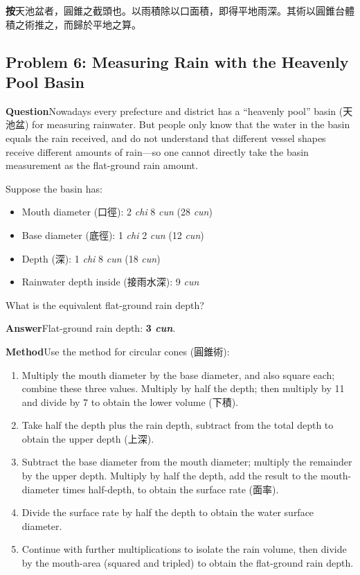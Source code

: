 \documentclass[11pt,a4paper]{article}
\newcommand{\AnCN}{\textbf{\color{headcolor}按}}
\newcommand{\WenEN}{\textbf{\color{headcolor}Question}}
\newcommand{\DaEN}{\textbf{\color{headcolor}Answer}}
\newcommand{\ShuEN}{\textbf{\color{headcolor}Method}}
\begin{document}
\vspace{0.5em}
\AnCN{}\quad 天池盆者，圓錐之截頭也。以雨積除以口面積，即得平地雨深。其術以圓錐台體積之術推之，而歸於平地之算。

\switchcolumn[1]
\subsection*{Problem 6: Measuring Rain with the Heavenly Pool Basin}
\label{sec:tianchiceyu}

\vspace{0.5em}
\WenEN{}\quad Nowadays every prefecture and district has a ``heavenly pool'' basin (天池盆) for measuring rainwater. But people only know that the water in the basin equals the rain received, and do not understand that different vessel shapes receive different amounts of rain---so one cannot directly take the basin measurement as the flat-ground rain amount.

Suppose the basin has:
\begin{itemize}[noitemsep,topsep=0pt]
  \item Mouth diameter (口徑): 2 \textit{chi} 8 \textit{cun} (28 \textit{cun})
  \item Base diameter (底徑): 1 \textit{chi} 2 \textit{cun} (12 \textit{cun})
  \item Depth (深): 1 \textit{chi} 8 \textit{cun} (18 \textit{cun})
  \item Rainwater depth inside (接雨水深): 9 \textit{cun}
\end{itemize}
What is the equivalent flat-ground rain depth?

\vspace{0.5em}
\DaEN{}\quad Flat-ground rain depth: \textbf{3 \textit{cun}}.

\vspace{0.5em}
\ShuEN{}\quad Use the method for circular cones (圓錐術):
\begin{enumerate}[noitemsep,topsep=0pt]
  \item Multiply the mouth diameter by the base diameter, and also square each; combine these three values. Multiply by half the depth; then multiply by 11 and divide by 7 to obtain the lower volume (下積).
  \item Take half the depth plus the rain depth, subtract from the total depth to obtain the upper depth (上深).
  \item Subtract the base diameter from the mouth diameter; multiply the remainder by the upper depth. Multiply by half the depth, add the result to the mouth-diameter times half-depth, to obtain the surface rate (面率).
  \item Divide the surface rate by half the depth to obtain the water surface diameter.
  \item Continue with further multiplications to isolate the rain volume, then divide by the mouth-area (squared and tripled) to obtain the flat-ground rain depth.
\end{enumerate}
\end{document}
